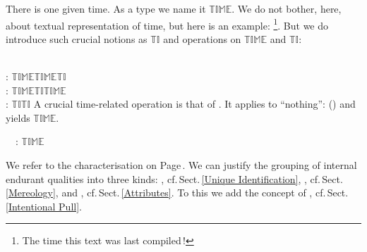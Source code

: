 \label{final:Time}

\begynd
\pind There is one given time.
\pind As a type we name it $\mathbb{TIME}$.
\begynd
\pind We do not bother, here, about textual representation of time, 
\pind but here is an example: \texttt{\todaytime}\footnote{The time
      this text was last compiled\,!}.
\afslut
\pind But we do introduce such crucial notions as
\begynd
\pind {} $\mathbb{TI}$ and
\pind operations on $\mathbb{TIME}$ and $\mathbb{TI}$:

\bp
{}\\
\>\>{\MINUS}: $\mathbb{TIME}${\TIMES}$\mathbb{TIME}${\RIGHTARROW}$\mathbb{TI}$ \\
\>\>{\PLUS}: $\mathbb{TIME}${\TIMES}$\mathbb{TI}${\RIGHTARROW}$\mathbb{TIME}$ \\
\>\>{\AST}: $\mathbb{TI}${\RIGHTARROW}$\mathbb{TI}$ 
\ep
\afslut
\noindent
\pind A crucial time-related operation is that of \textsf{}.
\pind It applies to ``nothing'':
      \textsf{()} and yields $\mathbb{TIME}$.
\afslut

\bp
{}\ \ \textsf{}:  {\RIGHTARROW} $\mathbb{TIME}$
\ep
{}



\label{Internal Qualities}

\begynd
\pind We refer to the  characterisation on
      Page\,\pageref{char:internal-qualities}.
\pind We can justify the grouping of internal endurant qualities into
three kinds:
\begynd
\pind {}, cf.\,Sect.\,\ref{Unique Identification},
\pind {}, cf.\,Sect.\,\ref{Mereology}, and
\pind {}, cf.\,Sect.\,\ref{Attributes}.
\pind To this we add the concept of ,
      cf.\,Sect.\,\ref{Intentional Pull}. 
\afslut
\afslut

\label{Unique Identification}


